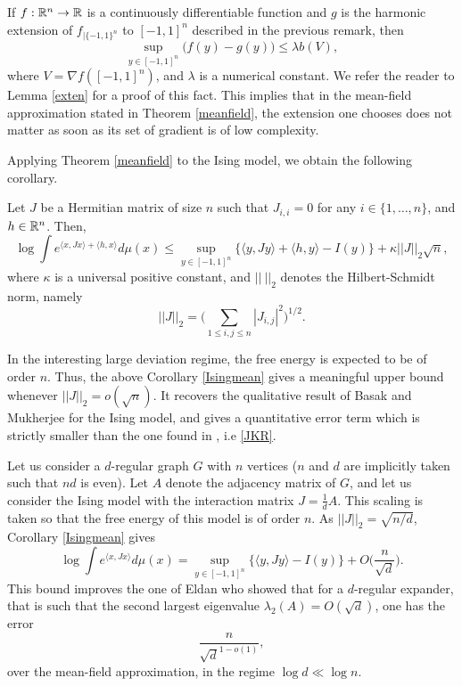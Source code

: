 \documentclass[a4paper,oneside,11pt]{article}
\begin{document}
\begin{Rem}
If $f :\mathbb{R}^n \to \mathbb{R}$ is a continuously differentiable function and $g$ is the harmonic extension of $f_{|\{-1,1\}^n}$ to $[-1,1]^n$ described in the previous remark, then 
$$ \sup_{y \in[-1,1]^n} \big( f(y) - g(y)\big)  \leq \lambda  b(V),$$
where $V = \nabla f( [-1,1]^n)$, and $\lambda$ is a numerical constant. We refer the reader to Lemma \ref{exten} for a proof of this fact.
This implies that in the mean-field approximation stated in Theorem \ref{meanfield}, the extension one chooses does not matter as soon as its set of gradient is of low complexity. 

\end{Rem}
Applying Theorem \ref{meanfield} to the Ising model, we obtain the following corollary.
\begin{Cor}\label{Isingmean}
 Let $J$ be a Hermitian matrix of size $n$ such that $J_{i,i} = 0$ for any $i\in\{1,\ldots,n\}$, and $h\in \mathbb{R}^n$. Then,
$$ \log \int e^{\langle x, Jx \rangle+ \langle h, x\rangle }d\mu(x)  \leq \sup_{y \in [-1,1]^n} \{ \langle y,J y\rangle + \langle h,y \rangle  - I(y)\} +  \kappa || J ||_2 \sqrt{n},$$
where $\kappa$ is a universal positive constant, and $|| \ ||_2$ denotes the Hilbert-Schmidt norm, namely
$$ || J||_2 = \Big( \sum_{1\leq i,j \leq n} |J_{i,j}|^2 \Big)^{1/2}.$$
\end{Cor}

In the interesting large deviation regime, the free energy is expected to be of order $n$. Thus, the above Corollary  \ref{Isingmean} gives a meaningful upper bound whenever $||J||_2 = o(\sqrt{n})$. It recovers the qualitative result of Basak and Mukherjee \cite{BM} for the Ising model, and gives a quantitative error term which is strictly smaller than the one found in \cite{JKR}, i.e \eqref{JKR}.

%
%

\begin{Exe} Let us consider a $d$-regular graph $G$ with $n$ vertices ($n$ and $d$ are implicitly taken such that $nd$ is even). Let $A$ denote the adjacency matrix of $G$, and let us consider the Ising model with the interaction matrix $J = \frac{1}{d} A$. This scaling is taken so that the free energy of this model is of order $n$. 
As $||J||_2 = \sqrt{n/d}$, Corollary \ref{Isingmean} gives
$$ \log \int e^{\langle x, Jx \rangle} d\mu(x) = \sup_{y \in [-1,1]^n} \{ \langle y,J y\rangle -I(y)\} +  O\Big(\frac{n}{\sqrt{d}}\Big).$$
This bound improves the one of Eldan \cite[Example 3]{Eldanmean} who showed that for a $d$-regular expander, that is such that the second largest eigenvalue $\lambda_2(A) =O(\sqrt{d})$, one has the error 
$$ \frac{n}{\sqrt{d}^{1-o(1)}},$$
over the mean-field approximation, in the regime $\log d \ll \log n$.




\end{Exe}
\end{document}
